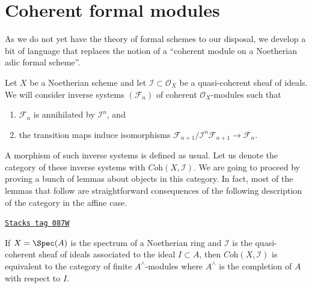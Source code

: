 \section{Coherent formal modules}
\label{coherent-section-coherent-formal}
As we do not yet have the theory of formal schemes to our disposal, we
develop a bit of language that replaces the notion of a ``coherent module on a
Noetherian adic formal scheme''.

\medskip\noindent
Let $X$ be a Noetherian scheme and let $\mathcal{I} \subset \mathcal{O}_X$
be a quasi-coherent sheaf of ideals. We will consider inverse
systems $(\mathcal{F}_n)$ of coherent $\mathcal{O}_X$-modules such that
\begin{enumerate}
\item $\mathcal{F}_n$ is annihilated by $\mathcal{I}^n$, and
\item the transition maps induce isomorphisms
$\mathcal{F}_{n + 1}/\mathcal{I}^n\mathcal{F}_{n + 1} \to \mathcal{F}_n$.
\end{enumerate}
A morphism of such inverse systems is defined as usual.
Let us denote the category of these inverse systems with
$\textit{Coh}(X, \mathcal{I})$. We are going to proceed by proving
a bunch of lemmas about objects in this category. In fact, most
of the lemmas that follow are straightforward consequences of the following
description of the category in the affine case.

\begin{lemma}
\label{coherent-lemma-inverse-systems-affine}
\href{https://stacks.math.columbia.edu/tag/087W}{\texttt{Stacks tag 087W}}

If $X = \Spec(A)$ is the spectrum of a Noetherian ring and
$\mathcal{I}$ is the quasi-coherent sheaf of ideals associated to the ideal
$I \subset A$, then $\textit{Coh}(X, \mathcal{I})$ is equivalent to the
category of finite $A^\wedge$-modules where $A^\wedge$ is the completion
of $A$ with respect to $I$.
\end{lemma}

